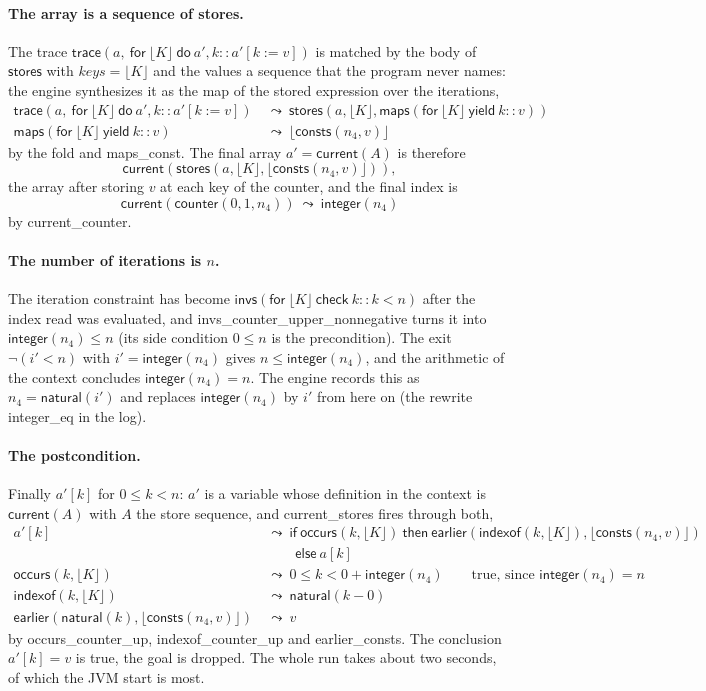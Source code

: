 \documentclass[11pt,a4paper]{article}
\newcommand{\bl}[1]{\lfloor #1\rfloor}                       %
\newcommand{\tr}[3]{\mathsf{trace}(#1,\ \mathsf{for}\ #2\ \mathsf{do}\ #3)}
\newcommand{\mapc}[2]{\mathsf{maps}(\mathsf{for}\ #1\ \mathsf{yield}\ #2)}
\newcommand{\al}[2]{\mathsf{invs}(\mathsf{for}\ #1\ \mathsf{check}\ #2)}
\newcommand{\cnt}{\mathsf{counter}}
\newcommand{\cur}{\mathsf{current}}
\newcommand{\ear}{\mathsf{earlier}}
\newcommand{\intf}{\mathsf{integer}}
\newcommand{\natf}{\mathsf{natural}}
\newcommand{\stores}{\mathsf{stores}}
\newcommand{\consts}{\mathsf{consts}}
\newcommand{\occurs}{\mathsf{occurs}}
\newcommand{\indexof}{\mathsf{indexof}}
\newcommand{\lemma}[1]{\textsf{#1}}
\newcommand{\rw}{\ \leadsto\ }
\begin{document}
\paragraph{The array is a sequence of stores.} The trace $\tr{a}{\bl{K}}{a', k :: a'[k := v]}$ is matched by the
body of $\stores$ with $keys = \bl{K}$ and the values a sequence that the program never names: the engine
synthesizes it as the map of the stored expression over the iterations,
\begin{align*}
\tr{a}{\bl{K}}{a', k :: a'[k := v]} &\rw \stores(a, \bl{K}, \mapc{\bl{K}}{k :: v}) \\
\mapc{\bl{K}}{k :: v} &\rw \bl{\consts(n_4, v)}
\end{align*}
by the fold and \lemma{maps\_const}. The final array $a' = \cur(A)$ is therefore
\[
\cur(\stores(a, \bl{K}, \bl{\consts(n_4, v)})),
\]
the array after storing $v$ at each key of the counter, and the final index is
\[
\cur(\cnt(0, 1, n_4)) \rw \intf(n_4)
\]
by \lemma{current\_counter}.

\paragraph{The number of iterations is $n$.} The iteration constraint has become
$\al{\bl{K}}{k :: k < n}$ after the index read was evaluated, and \lemma{invs\_counter\_upper\_nonnegative} turns
it into $\intf(n_4) \le n$ (its side condition $0 \le n$ is the precondition). The exit $\neg(i' < n)$ with
$i' = \intf(n_4)$ gives $n \le \intf(n_4)$, and the arithmetic of the context concludes $\intf(n_4) = n$. The engine
records this as $n_4 = \natf(i')$ and replaces $\intf(n_4)$ by $i'$ from here on (the rewrite \lemma{integer\_eq}
in the log).

\paragraph{The postcondition.} Finally $a'[k]$ for $0 \le k < n$: $a'$ is a variable whose definition in the context
is $\cur(A)$ with $A$ the store sequence, and \lemma{current\_stores} fires through both,
\begin{align*}
a'[k] &\rw \mathsf{if}\ \occurs(k, \bl{K})\ \mathsf{then}\ \ear(\indexof(k, \bl{K}), \bl{\consts(n_4, v)}) \\
&\qquad\ \mathsf{else}\ a[k] \\
\occurs(k, \bl{K}) &\rw 0 \le k < 0 + \intf(n_4) \qquad\text{true, since } \intf(n_4) = n \\
\indexof(k, \bl{K}) &\rw \natf(k - 0) \\
\ear(\natf(k), \bl{\consts(n_4, v)}) &\rw v
\end{align*}
by \lemma{occurs\_counter\_up}, \lemma{indexof\_counter\_up} and \lemma{earlier\_consts}. The conclusion $a'[k] = v$
is true, the goal is dropped. The whole run takes about two seconds, of which the JVM start is most.
\end{document}

